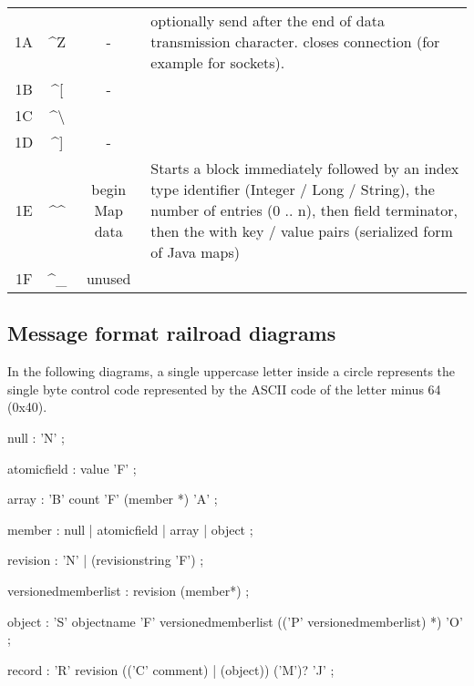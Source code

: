 \documentclass[11pt,a4paper,oneside]{article}
\begin{document}
\begin{tabular}{|c|c|c|p{8cm}|}
1A & \textasciicircum Z & - & optionally send after the end of data
transmission character. closes connection (for example for sockets). \\
1B & \textasciicircum [ &       -            & \\
1C & \textasciicircum \textbackslash &                   & \\
1D & \textasciicircum ] & -& \\
1E & \textasciicircum \textasciicircum & begin Map data & Starts a block immediately followed by an index type identifier
(Integer / Long / String), the number of entries (0 .. n), then field terminator, then the with key / value pairs (serialized
form of Java maps)\\
1F & \textasciicircum \_ &  unused         & \\
\hline
\end{tabular}

\vspace{8mm}

\subsection{Message format railroad diagrams}
In the following diagrams, a single uppercase letter inside a circle represents the single byte control code represented by the ASCII code of the letter minus 64 (0x40).
 


\begin{rail}
null : 'N'
    ;
   
atomicfield : value 'F'
    ;
   
array :
    'B' count 'F' (member *) 'A'
    ;

member : null | atomicfield | array | object
    ;

revision : 'N' | (revisionstring 'F')
    ;
   
\end{rail}
        
\begin{rail}
versionedmemberlist :
    revision (member*)
    ;
\end{rail}
        
\begin{rail}
object :
    'S' objectname 'F' versionedmemberlist
          (('P' versionedmemberlist) *)
    'O'
    ;
\end{rail}
        
\begin{rail}
record :
    'R' revision
                          (('C' comment) | (object))
                                                    ('M')? 'J'
    ;
\end{rail}
        
\end{document}
